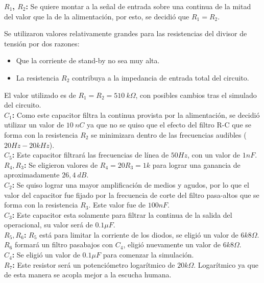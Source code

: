 \textbf{$R_1$, $R_2$:} Se quiere montar a la señal de entrada sobre una continua de la mitad del valor que la de la alimentación, por esto, se decidió que $R_1=R_2$.

Se utilizaron valores relativamente grandes para las resistencias del divisor de tensión por dos razones:
\begin{itemize}
\item Que la corriente de stand-by no sea muy alta.
\item La resistencia $R_2$ contribuya a la impedancia de entrada total del circuito.
\end{itemize}
El valor utilizado es de $R_1=R_2=510 \ k\Omega$, con posibles cambios tras el simulado del circuito.\\

\textbf{$C_1$:} Como este capacitor filtra la continua provista por la alimentación, se decidió utilizar un valor de $10 \ nC$ ya que no se quiso que el efecto del filtro R-C que se forma con la resistencia $R_2$ se minimizara dentro de las frecuencias audibles ($20Hz-20kHz$).\\

\textbf{$C_5$:} Este capacitor filtrará las frecuencias de línea de $50Hz$, con un valor de $1nF$. \\

\textbf{$R_4, R_3$:} Se eligieron valores de $R_4=20R_3=1k$ para lograr una ganancia de aproximadamente $26,4 \ dB$.\\

\textbf{$C_2$:} Se quiso lograr una mayor amplificación de medios y agudos, por lo que el valor del capacitor fue fijado por la frecuencia de corte del filtro pasa-altos que se forma con la resistencia $R_3$. Este valor fue de $100nF$.\\

\textbf{$C_3$:} Este capacitor esta solamente para filtrar la continua de la salida del operacional, su valor será de $0.1\mu F$.\\

\textbf{$R_5, R_6$:} $R_5$ está para limitar la corriente de los diodos, se eligió un valor de $6k8\Omega$. $R_6$ formará un filtro pasabajos con $C_4$, eligió nuevamente un valor de $6k8\Omega$.\\

\textbf{$C_4$:} Se eligió un valor de $0.1\mu F$ para comenzar la simulación.\\

\textbf{$R_7$:} Este resistor será un potenciómetro logarítmico de $20k\Omega$. Logarítmico ya que de esta manera se acopla mejor a la escucha humana.

